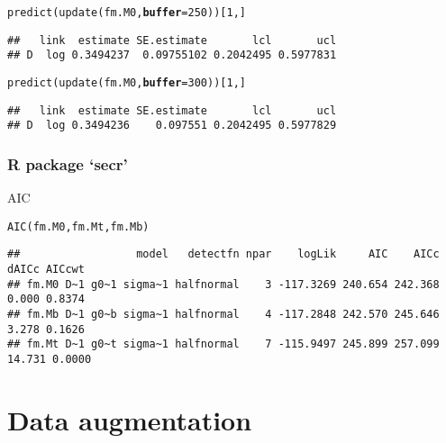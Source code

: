 \documentclass[color=usenames,dvipsnames]{beamer}\usepackage[]{graphicx}\usepackage[]{xcolor}
\makeatletter
\newcommand{\hlnum}[1]{\textcolor[rgb]{0.69,0.494,0}{#1}}%
\newcommand{\hldef}[1]{\textcolor[rgb]{0,0,0}{#1}}%
\newcommand{\hlkwc}[1]{\textcolor[rgb]{0,0,0}{\textbf{#1}}}%
\newcommand{\hlkwd}[1]{\textcolor[rgb]{0.004,0.004,0.506}{#1}}%
\newenvironment{kframe}{%
 \def\at@end@of@kframe{}%
 \ifinner\ifhmode%
  \def\at@end@of@kframe{\end{minipage}}%
  \begin{minipage}{\columnwidth}%
 \fi\fi%
 \def\FrameCommand##1{\hskip\@totalleftmargin \hskip-\fboxsep
 \colorbox{shadecolor}{##1}\hskip-\fboxsep
     \hskip-\linewidth \hskip-\@totalleftmargin \hskip\columnwidth}%
 \MakeFramed {\advance\hsize-\width
   \@totalleftmargin\z@ \linewidth\hsize
   \@setminipage}}%
 {\par\unskip\endMakeFramed%
 \at@end@of@kframe}
\newenvironment{knitrout}{}{} %
\let\hlstd\hldef
\makeatother
\begin{document}
\begin{frame}[fragile]
\begin{knitrout}
\begin{kframe}
\begin{alltt}
\hlkwd{predict}\hlstd{(}\hlkwd{update}\hlstd{(fm.M0,} \hlkwc{buffer}\hlstd{=}\hlnum{250}\hlstd{))[}\hlnum{1}\hlstd{,]}
\end{alltt}
\begin{verbatim}
##   link  estimate SE.estimate       lcl       ucl
## D  log 0.3494237  0.09755102 0.2042495 0.5977831
\end{verbatim}
\end{kframe}
\end{knitrout}
\pause
\vspace{-12pt}
\begin{knitrout}\scriptsize
{}\color{fgcolor}\begin{kframe}
\begin{alltt}
\hlkwd{predict}\hlstd{(}\hlkwd{update}\hlstd{(fm.M0,} \hlkwc{buffer}\hlstd{=}\hlnum{300}\hlstd{))[}\hlnum{1}\hlstd{,]}
\end{alltt}
\begin{verbatim}
##   link  estimate SE.estimate       lcl       ucl
## D  log 0.3494236    0.097551 0.2042495 0.5977829
\end{verbatim}
\end{kframe}
\end{knitrout}
\end{frame}



\begin{frame}[fragile]
  \frametitle{R package `secr'}
  AIC
\begin{knitrout}\tiny
{}\color{fgcolor}\begin{kframe}
\begin{alltt}
\hlkwd{AIC}\hlstd{(fm.M0, fm.Mt, fm.Mb)}
\end{alltt}
\begin{verbatim}
##                  model   detectfn npar    logLik     AIC    AICc  dAICc AICcwt
## fm.M0 D~1 g0~1 sigma~1 halfnormal    3 -117.3269 240.654 242.368  0.000 0.8374
## fm.Mb D~1 g0~b sigma~1 halfnormal    4 -117.2848 242.570 245.646  3.278 0.1626
## fm.Mt D~1 g0~t sigma~1 halfnormal    7 -115.9497 245.899 257.099 14.731 0.0000
\end{verbatim}
\end{kframe}
\end{knitrout}
\end{frame}


\section{Data augmentation}
\end{document}
